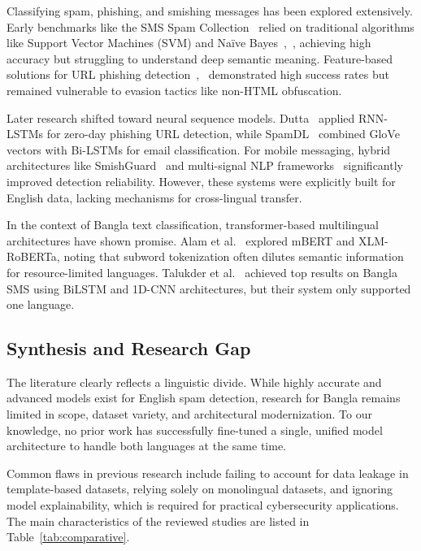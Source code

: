 \documentclass[journal]{IEEEtran}
\begin{document}
Classifying spam, phishing, and smishing messages has been explored extensively. Early benchmarks like the SMS Spam Collection~\cite{ref1} relied on traditional algorithms like Support Vector Machines (SVM) and Naïve Bayes~\cite{ref1},~\cite{ref5}, achieving high accuracy but struggling to understand deep semantic meaning. Feature-based solutions for URL phishing detection~\cite{ref2},~\cite{ref8} demonstrated high success rates but remained vulnerable to evasion tactics like non-HTML obfuscation.

Later research shifted toward neural sequence models. Dutta~\cite{ref3} applied RNN-LSTMs for zero-day phishing URL detection, while SpamDL~\cite{ref9} combined GloVe vectors with Bi-LSTMs for email classification. For mobile messaging, hybrid architectures like SmishGuard~\cite{ref6} and multi-signal NLP frameworks~\cite{ref10} significantly improved detection reliability. However, these systems were explicitly built for English data, lacking mechanisms for cross-lingual transfer.

In the context of Bangla text classification, transformer-based multilingual architectures have shown promise. Alam et al.~\cite{ref4} explored mBERT and XLM-RoBERTa, noting that subword tokenization often dilutes semantic information for resource-limited languages. Talukder et al.~\cite{ref7} achieved top results on Bangla SMS using BiLSTM and 1D-CNN architectures, but their system only supported one language.

\subsection{Synthesis and Research Gap}

The literature clearly reflects a linguistic divide. While highly accurate and advanced models exist for English spam detection, research for Bangla remains limited in scope, dataset variety, and architectural modernization. To our knowledge, no prior work has successfully fine-tuned a single, unified model architecture to handle both languages at the same time.

Common flaws in previous research include failing to account for data leakage in template-based datasets, relying solely on monolingual datasets, and ignoring model explainability, which is required for practical cybersecurity applications. The main characteristics of the reviewed studies are listed in Table~\ref{tab:comparative}.
\end{document}
